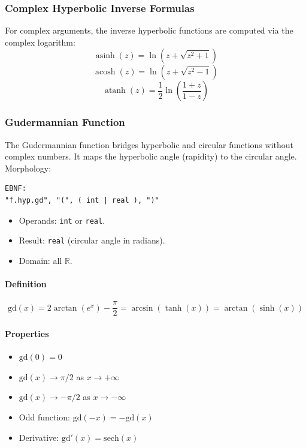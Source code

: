 \subsubsection{Complex Hyperbolic Inverse Formulas}
For complex arguments, the inverse hyperbolic functions are computed via the complex logarithm:
\[
\operatorname{asinh}(z) = \ln\!\left(z + \sqrt{z^2 + 1}\right)
\]
\[
\operatorname{acosh}(z) = \ln\!\left(z + \sqrt{z^2 - 1}\right)
\]
\[
\operatorname{atanh}(z) = \frac{1}{2} \ln\!\left(\frac{1 + z}{1 - z}\right)
\]

\subsubsection{Gudermannian Function}
The Gudermannian function bridges hyperbolic and circular functions without complex numbers. It maps the hyperbolic angle (rapidity) to the circular angle.\\
Morphology:
\begin{verbatim}
EBNF:
"f.hyp.gd", "(", ( int | real ), ")"
\end{verbatim}
\begin{itemize}
\item Operands: \texttt{int} or \texttt{real}.
\item Result: \texttt{real} (circular angle in radians).
\item Domain: all $\mathbb{R}$.
\end{itemize}

\paragraph{Definition}
\[
\text{gd}(x) = 2 \arctan(e^x) - \frac{\pi}{2} = \arcsin(\tanh(x)) = \arctan(\sinh(x))
\]

\paragraph{Properties}
\begin{itemize}
\item $\text{gd}(0) = 0$
\item $\text{gd}(x) \to \pi/2$ as $x \to +\infty$
\item $\text{gd}(x) \to -\pi/2$ as $x \to -\infty$
\item Odd function: $\text{gd}(-x) = -\text{gd}(x)$
\item Derivative: $\text{gd}'(x) = \text{sech}(x)$
\end{itemize}

